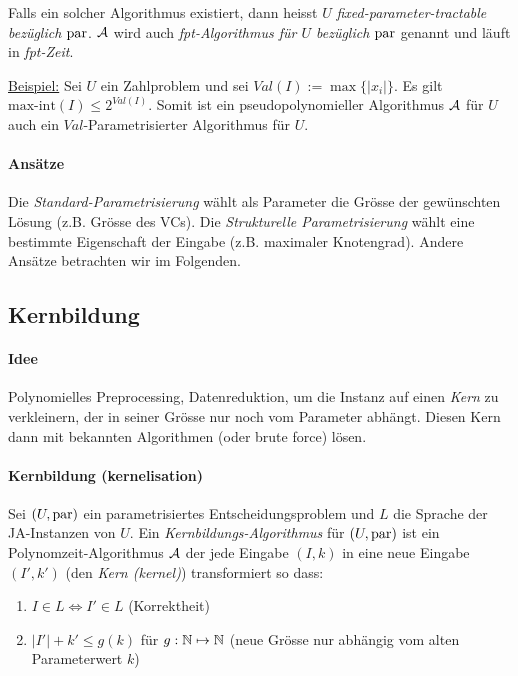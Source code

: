 Falls ein solcher Algorithmus existiert, dann heisst $U$ \emph{fixed-parameter-tractable 
bezüglich $\text{par}$}.
$\mathcal{A}$ wird auch \emph{fpt-Algorithmus für $U$ bezüglich $\text{par}$} genannt und läuft in \emph{fpt-Zeit}.

\underline{Beispiel:} Sei $U$ ein Zahlproblem und sei $Val(I) := \max \{ |x_i| \}$.
Es gilt $\text{max-int}(I) \leq 2^{Val(I)}$. Somit ist ein pseudopolynomieller 
Algorithmus $\mathcal{A}$ für $U$ auch ein $Val$-Parametrisierter Algorithmus für $U$.

\paragraph{Ansätze}
Die \emph{Standard-Parametrisierung} wählt als Parameter die Grösse der gewünschten 
Lösung (z.B. Grösse des VCs).
Die \emph{Strukturelle Parametrisierung} wählt eine bestimmte Eigenschaft der Eingabe 
(z.B. maximaler Knotengrad).
Andere Ansätze betrachten wir im Folgenden.


\subsection{Kernbildung}

\paragraph{Idee}
Polynomielles Preprocessing, Datenreduktion, um die Instanz auf einen \emph{Kern} zu verkleinern,
der in seiner Grösse nur noch vom Parameter abhängt.
Diesen Kern dann mit bekannten Algorithmen (oder brute force) lösen.

\paragraph{Kernbildung (kernelisation)}
Sei $(U, \text{par})$ ein parametrisiertes Entscheidungsproblem und $L$ die Sprache der JA-Instanzen von $U$.
Ein \emph{Kernbildungs-Algorithmus} für $(U, \text{par})$ ist ein Polynomzeit-Algorithmus 
$\mathcal{A}$ der jede Eingabe $(I, k)$
in eine neue Eingabe $(I', k')$ (den \emph{Kern (kernel)}) transformiert so dass:
\begin{enumerate}[label=(\roman*)]
    \item $ I \in L \iff I' \in L $ (Korrektheit)
    \item $ |I'| + k' \leq g(k) $ für $g : \mathbb{N} \mapsto \mathbb{N}$ (neue Grösse nur abhängig 
    vom alten Parameterwert $k$)
\end{enumerate}

